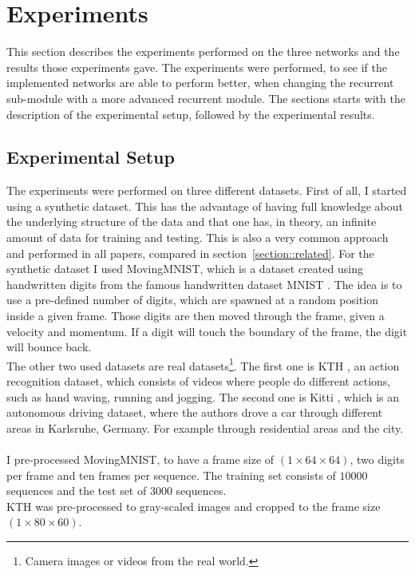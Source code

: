 \section{Experiments} \label{section::experiments}
 This section describes the experiments performed on the three networks and the results those experiments gave. The experiments were performed, to see if the 
 implemented networks are able to perform better, when changing the recurrent sub-module with a more advanced recurrent module. The sections starts with the  
 description of the experimental setup, followed by the experimental results.
 
 \subsection{Experimental Setup}
  The experiments were performed on three different datasets. First of all, I started using a synthetic dataset. This has the advantage of having full knowledge
  about the underlying structure of the data and that one has, in theory, an infinite amount of data for training and testing. This is also a very common approach
  and performed in all papers, compared in section~\ref{section::related}.
  For the synthetic dataset I used MovingMNIST, which is a dataset created using handwritten digits from the famous handwritten dataset MNIST
  \cite{LeCun1998}. The idea is to use a pre-defined number of digits, which are spawned at a random position inside a given frame. Those digits are then moved 
  through the frame, given a velocity and momentum. If a digit will touch the boundary of the frame, the digit will bounce back.\\
  The other two used datasets are real datasets\footnote{Camera images or videos from the real world.}.
  The first one is KTH \cite{Schuldt2004}, an action recognition dataset, which consists of videos where people
  do different actions, such as hand waving, running and jogging. The second one is Kitti \cite{Geiger2013}, which is an autonomous driving dataset, where
  the authors drove a car through different areas in Karlsruhe, Germany. For example through residential areas and the city.\\\\
  I pre-processed MovingMNIST, to have a frame size of $(1 \times 64 \times 64)$, two digits per frame and ten frames per sequence.
  The training set consists of $10000$ sequences and the test set of $3000$ sequences.\\
  KTH was pre-processed to gray-scaled images and cropped to the frame size $(1 \times 80 \times 60)$.\\
